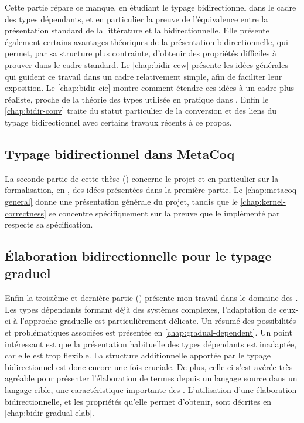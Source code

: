 Cette partie répare ce manque, en étudiant le
typage bidirectionnel dans le cadre des types dépendants, et en particulier la
preuve de l’équivalence entre la présentation standard de la littérature et la
bidirectionnelle. Elle présente également
certains avantages théoriques de la présentation bidirectionnelle,
qui permet, par sa structure plus contrainte, d’obtenir des propriétés
difficiles à prouver dans le cadre standard.
Le \cref{chap:bidir-ccw} présente les idées générales qui guident ce travail
dans un cadre relativement simple, afin de faciliter leur exposition. 
Le \cref{chap:bidir-cic} montre comment étendre ces idées à un
cadre plus réaliste, proche de la théorie des types utilisée en pratique dans .
Enfin le \cref{chap:bidir-conv} traite du statut particulier de la
conversion
et des liens du typage bidirectionnel avec certains travaux récents
à ce propos.

\subsection{Typage bidirectionnel dans MetaCoq}

La seconde partie de cette thèse ()
concerne le projet 
et en particulier sur la formalisation, en , des idées présentées dans la
première partie. Le \cref{chap:metacoq-general} donne une présentation générale du
projet, tandis que le \cref{chap:kernel-correctness} se concentre spécifiquement
sur la preuve que le  implémenté par  respecte sa spécification.

\subsection{Élaboration bidirectionnelle pour le typage graduel}

Enfin la troisième et dernière partie ()
présente mon travail
dans le domaine des . Les types dépendants formant déjà des systèmes
complexes, l’adaptation de ceux-ci à l’approche graduelle est particulièrement
délicate. Un résumé des possibilités et problématiques associées est présentée
en \cref{chap:gradual-dependent}.
Un point intéressant est que la présentation habituelle
des types dépendants est inadaptée,
car elle est trop flexible. La structure additionnelle apportée
par le typage bidirectionnel est donc encore une fois cruciale.
De plus, celle-ci s’est avérée très agréable pour présenter
l’élaboration de termes depuis un langage source dans un langage cible, une
caractéristique importante des .
L’utilisation d’une élaboration bidirectionnelle, et les propriétés qu’elle
permet d’obtenir, sont décrites en \cref{chap:bidir-gradual-elab}.

